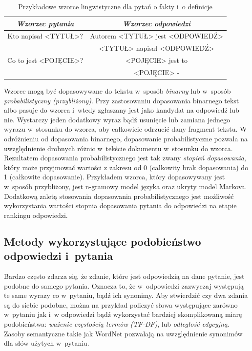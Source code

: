 \documentclass[a4paper, twoside, 12pt]{report}
\begin{document}
            \begin{table}[h]
                \begin{tabular}{ | c | c | }
                  \hline
                  \emph{Wzorzec pytania} & \emph{Wzorzec odpowiedzi} \\ \hline
                  Kto napisał <TYTUŁ>? & Autorem <TYTUŁ> jest <ODPOWIEDŹ> \\
                   & <TYTUŁ> napisał <ODPOWIEDŹ>\\ \hline
                  Co to jest <POJĘCIE>? & <POJĘCIE> jest to \\
                   & <POJĘCIE> - \\
                  \hline
                \end{tabular}
                \caption{Przykładowe wzorce lingwistyczne dla pytań o fakty i~o definicje}
                \label{TAB:PATTERNS}
            \end{table}

            Wzorce mogą być dopasowywane do tekstu w~sposób \emph{binarny} lub w~sposób \emph{probabilistyczny (przybliżony)}. Przy
            zastosowaniu dopasowania binarnego tekst albo pasuje do wzorca i~wtedy zgłaszany jest jako kandydat na
            odpowiedź lub nie. Wystarczy jeden dodatkowy wyraz bądź usunięcie lub zamiana  jednego wyrazu w~stosunku
            do wzorca, aby całkowicie odrzucić dany fragment tekstu. W odróżnieniu od dopasowania binarnego, dopasowanie
            probabilistyczne pozwala na uwzględnienie drobnych różnic w~tekście dokumentu w~stosunku do wzorca. Rezultatem
            dopasowania probabilistycznego jest tak zwany \emph{stopień dopasowania}, który może przyjmować wartości z
            zakresu od 0 (całkowity brak dopasowania) do 1 (całkowite dopasowanie). Przykładem wzorca, który dopasowywany
            jest w~sposób przybliżony, jest n-gramowy model języka oraz ukryty model Markova\cite{SOFTPATTERNMATCHING}.
            Dodatkową zaletą stosowania dopasowania probabilistycznego jest możliwość wykorzystania wartości stopnia
            dopasowania pytania do odpowiedzi na etapie rankingu odpowiedzi.

        \subsection{Metody wykorzystujące podobieństwo odpowiedzi i~pytania}
            Bardzo często zdarza się, że zdanie, które jest odpowiedzią na dane pytanie, jest podobne do samego pytania.
            Oznacza to, że w~odpowiedzi zazwyczaj występują te same wyrazy co w~pytaniu, bądź ich synonimy. Aby stwierdzić
            czy dwa zdania są do siebie podobne, można na przykład policzyć słowa występujące zarówno w~pytaniu jak i~w
            odpowiedzi bądź wykorzystać bardziej skomplikowaną miarę podobieństwa: \emph{ważenie częstością termów (TF-DF)},
            lub \emph{odległość edycyjną}. Zasoby semantyczne
            takie jak WordNet pozwalają na uwzględnienie synonimów dla słów użytych w~pytaniu.
\end{document}
